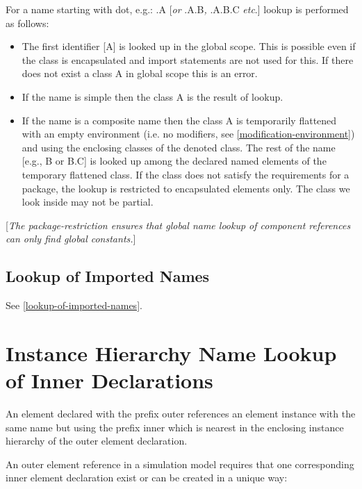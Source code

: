 For a name starting with dot, e.g.: .A {[}\emph{or} .A.B\emph{,} .A.B.C
\emph{etc}.{]} lookup is performed as follows:

\begin{itemize}
\item
  The first identifier [A] is looked up in the global scope. This is
  possible even if the class is encapsulated and import statements are
  not used for this. If there does not exist a class A in global scope
  this is an error.
\item
  If the name is simple then the class A is the result of lookup.
\item
  If the name is a composite name then the class A is temporarily
  flattened with an empty environment (i.e. no modifiers, see 
  \ref{modification-environment}) and using the enclosing classes of the denoted class. The rest
  of the name [e.g., B or B.C] is looked up among the declared named
  elements of the temporary flattened class. If the class does not
  satisfy the requirements for a package, the lookup is restricted to
  encapsulated elements only. The class we look inside may not be
  partial.
\end{itemize}

{[}\emph{The package-restriction ensures that global name lookup of
component references can only find global constants.}{]}

\subsection{Lookup of Imported Names}

See \ref{lookup-of-imported-names}.

\section{Instance Hierarchy Name Lookup of Inner Declarations}

An element declared with the prefix outer references an element instance
with the same name but using the prefix inner which is nearest in the
enclosing instance hierarchy of the outer element declaration.

An outer element reference in a simulation model requires that one
corresponding inner element declaration exist or can be created in a
unique way:

